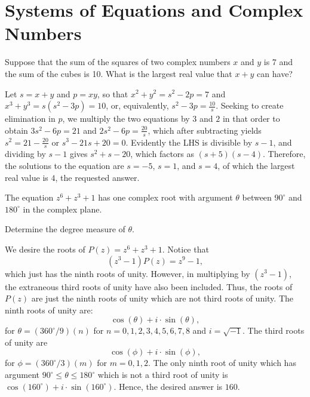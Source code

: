 \section{Systems of Equations and Complex Numbers}



\begin{question}[name={1983 AIME, \href{https://artofproblemsolving.com/community/c4p367523}{Problem 5}}]
	Suppose that the sum of the squares of two complex numbers $x$ and $y$ is 7 and the sum of the cubes is 10. What is the largest real value that $x + y$ can have?	
\end{question}


\begin{solution}[name={Solution by peace09}]
	Let $s=x+y$ and $p=xy$, so that $x^2+y^2=s^2-2p=7$ and $x^3+y^3=s(s^2-3p)=10$, or, equivalently, $s^2-3p=\tfrac{10}{s}$. Seeking to create elimination in $p$, we multiply the two equations by $3$ and $2$ in that order to obtain $3s^2-6p=21$ and $2s^2-6p=\tfrac{20}{s}$, which after subtracting yields $s^2=21-\tfrac{20}{s}$ or $s^3-21s+20=0$. Evidently the LHS is divisible by $s-1$, and dividing by $s-1$ gives $s^2+s-20$, which factors as $(s+5)(s-4)$. Therefore, the solutions to the equation are $s=-5$, $s=1$, and $s=4$, of which the largest real value is $\boxed{4}$, the requested answer.
\end{solution}




\begin{question}[name={1984 AIME, \href{https://artofproblemsolving.com/community/c4h66510p392620}{Problem 8}}]
	The equation $z^6 + z^3 + 1$ has one complex root with argument $\theta$ between $90^\circ$ and $180^\circ$ in the complex plane.
	
	Determine the degree measure of $\theta$.
\end{question}

\begin{solution}[name={Solution by S. Zhu}]
	We desire the roots of $P(z)=z^6+z^3+1$. Notice that\[ (z^3-1)P(z)=z^9-1, \]which just has the ninth roots of unity. However, in multiplying by $(z^3-1)$, the extraneous third roots of unity have also been included. Thus, the roots of $P(z)$ are just the ninth roots of unity which are not third roots of unity. The ninth roots of unity are:\[ \cos(\theta)+i\cdot\sin(\theta), \]for $\theta=\left({360^\circ}/{9}\right)(n)$ for $n=0,1,2,3,4,5,6,7,8$ and $i=\sqrt{-1}$.
	The third roots of unity are\[ \cos(\phi)+i\cdot\sin(\phi), \]for $\phi=\left({360^\circ}/{3}\right)(m)$ for $m=0,1,2$. The only ninth root of unity which has argument $90^\circ\le\theta\le180^\circ$ which is not a third root of unity is $\cos(160^\circ)+i\cdot\sin(160^\circ)$. Hence, the desired answer is $\boxed{160}$.
\end{solution}





